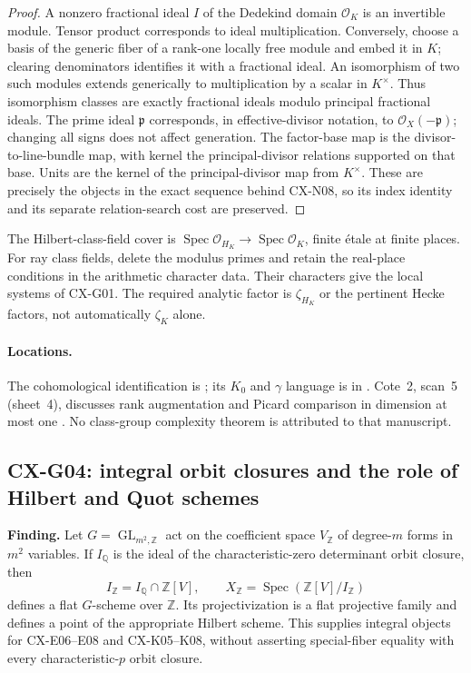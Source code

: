 \begin{proof}
A nonzero fractional ideal $I$ of the Dedekind domain $\mathcal O_K$ is an
invertible module.  Tensor product corresponds to ideal multiplication.
Conversely, choose a basis of the generic fiber of a rank-one locally free
module and embed it in $K$; clearing denominators identifies it with a
fractional ideal.  An isomorphism of two such modules extends generically
to multiplication by a scalar in $K^\times$.  Thus isomorphism classes
are exactly fractional ideals modulo principal fractional ideals.
The prime ideal $\mathfrak p$ corresponds, in effective-divisor notation,
to $\mathcal O_X(-\mathfrak p)$; changing all signs does not affect generation.
The factor-base map is the divisor-to-line-bundle map, with kernel the
principal-divisor relations supported on that base.  Units are the kernel
of the principal-divisor map from $K^\times$.  These are precisely the
objects in the exact sequence behind CX-N08, so its index identity and
its separate relation-search cost are preserved.
\end{proof}

The Hilbert-class-field cover is
$\operatorname{Spec}\mathcal O_{H_K}\to\operatorname{Spec}\mathcal O_K$,
finite étale at finite places.  For ray class fields, delete the modulus
primes and retain the real-place conditions in the arithmetic character data.
Their characters give the local systems of CX-G01.  The required analytic
factor is $\zeta_{H_K}$ or the pertinent Hecke factors, not automatically
$\zeta_K$ alone.

\paragraph{Locations.}
The cohomological identification is
\cite[Exp.~IX, Theorem~3.3]{SGA4}; its $K_0$ and $\gamma$ language is in
\cite[Exp.~V 3.10; Exp.~VI 3.2--3.3]{SGA6}.
Cote~2, scan~5 (sheet~4), discusses rank augmentation and Picard comparison
in dimension at most one \cite{Archive2}.  No class-group complexity
theorem is attributed to that manuscript.

\subsection{CX-G04: integral orbit closures and the role of Hilbert and Quot schemes}
\label{finding:CX-G04}

\textbf{Finding.} Let $G=\operatorname{GL}_{m^2,\mathbb Z}$ act on the
coefficient space $V_{\mathbb Z}$ of degree-$m$ forms in $m^2$ variables.
If $I_{\mathbb Q}$ is the ideal of the characteristic-zero determinant
orbit closure, then
\[
 I_{\mathbb Z}=I_{\mathbb Q}\cap\mathbb Z[V],\qquad
 X_{\mathbb Z}=\operatorname{Spec}(\mathbb Z[V]/I_{\mathbb Z})
\]
defines a flat $G$-scheme over $\mathbb Z$.  Its projectivization is a flat
projective family and defines a point of the appropriate Hilbert scheme.
This supplies integral objects for CX-E06--E08 and CX-K05--K08, without
asserting special-fiber equality with every characteristic-$p$ orbit closure.

